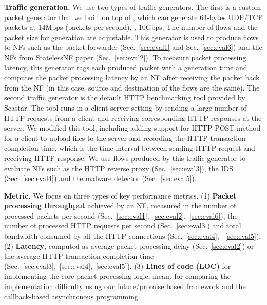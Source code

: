 \noindent \textbf{Traffic generation.} We use two types of traffic generators. The first is a custom packet generator that we built on top of \netstar, which can generate 64-bytes UDP/TCP packets at 14Mpps (packets per second), \ie, 10Gbps. The number of flows and the packet size for generation are adjustable. This generator is used to produce flows to NFs such as the packet forwarder (Sec.~\ref{sec:eval1} and Sec.~\ref{sec:eval6}) and the NFs from StatelessNF paper (Sec.~\ref{sec:eval2}). To measure packet processing latency, this generator tags each produced packet with a generation time and computes the packet processing latency by an NF after receiving the packet back from the NF (in this case, source and destination of the flows are the same). The second traffic generator is the default HTTP benchmarking tool provided by Seastar. The tool runs in a client-server setting by sending a large number of HTTP requests from a client and receiving corresponding HTTP responses at the server. We modified this tool, including adding support for HTTP POST method for a client to upload files to the server and recording the HTTP transaction completion time, which is the time interval between sending HTTP request and receiving HTTP response. We use flows produced by this traffic generator to evaluate NFs such as the HTTP reverse proxy (Sec.~\ref{sec:eval3}), the IDS (Sec.~\ref{sec:eval4}) and the malware detector (Sec.~\ref{sec:eval5}).


\noindent \textbf{Metric.}
We focus on three types of key performance metrics. (1) \textbf{Packet processing throughput} achieved by an NF, measured in the number of processed packets per second (Sec.~\ref{sec:eval1},~\ref{sec:eval2},~\ref{sec:eval6}), the number of processed HTTP requests per second (Sec.~\ref{sec:eval3}) and total bandwidth consumed by all the HTTP connections (Sec.~\ref{sec:eval4}, ~\ref{sec:eval5}).
(2) \textbf{Latency}, computed as average packet processing delay (Sec.~\ref{sec:eval2}) or the average HTTP transaction completion time (Sec.~\ref{sec:eval3},~\ref{sec:eval4},~\ref{sec:eval5}). (3) \textbf{Lines of code (LOC)} for implementing the core packet processing logic, meant for comparing the implementation difficulty using our future/promise based framework and the callback-based asynchronous programming. %

